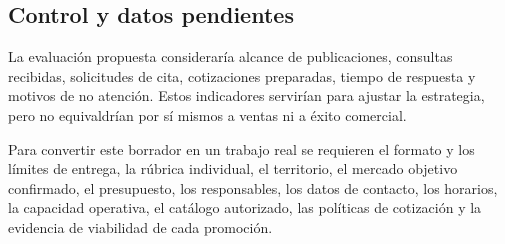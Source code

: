 \documentclass[12pt,letterpaper,oneside]{article}
\begin{document}
\subsection{Control y datos pendientes}

La evaluación propuesta consideraría alcance de publicaciones, consultas recibidas, solicitudes de cita, cotizaciones preparadas, tiempo de respuesta y motivos de no atención. Estos indicadores servirían para ajustar la estrategia, pero no equivaldrían por sí mismos a ventas ni a éxito comercial.

Para convertir este borrador en un trabajo real se requieren el formato y los límites de entrega, la rúbrica individual, el territorio, el mercado objetivo confirmado, el presupuesto, los responsables, los datos de contacto, los horarios, la capacidad operativa, el catálogo autorizado, las políticas de cotización y la evidencia de viabilidad de cada promoción.
\clearpage
\printbibliography[title={Fuentes de consulta}]
\end{document}
